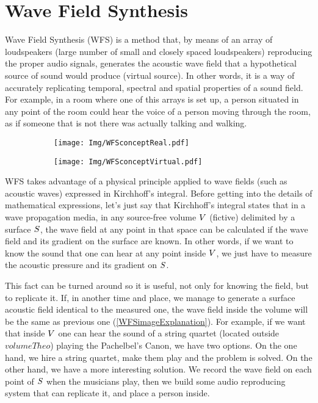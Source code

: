 \section{Wave Field Synthesis}
Wave Field Synthesis (WFS) is a method that, by means of an array of loudspeakers (large number of small and closely spaced loudspeakers) reproducing the proper audio signals, generates the acoustic wave field that a hypothetical source of sound would produce (virtual source). In other words, it is a way of accurately replicating temporal, spectral and spatial properties of a sound field. For example, in a room where one of this arrays is set up, a person situated in any point of the room could hear the voice of a person moving through the room, as if someone that is not there was actually talking and walking.

\begin{figure}[h]
	\centering
	\begin{subfigure}[c]{0.45\textwidth}
		\centering
		\texttt{[image: Img/WFSconceptReal.pdf]}
	\end{subfigure}
	\begin{subfigure}[c]{0.45\textwidth}
		\centering
		\texttt{[image: Img/WFSconceptVirtual.pdf]}
	\end{subfigure}
\end{figure}

WFS takes advantage of a physical principle applied to wave fields (such as acoustic waves) expressed in Kirchhoff's integral. Before getting into the details of mathematical expressions, let's just say that Kirchhoff's integral states that in a wave propagation media, in any source-free volume $V$ (fictive) delimited by a surface $S$, the wave field at any point in that space can be calculated if the wave field and its gradient on the surface are known. In other words, if we want to know the sound that one can hear at any point inside $V$, we just have to measure the acoustic pressure and its gradient on $S$.

This fact can be turned around so it is useful, not only for knowing the field, but to replicate it.
If, in another time and place, we manage to generate a surface acoustic field identical to the measured one, the wave field inside the volume will be the same as previous one (\autoref{WFSimageExplanation}).
For example, if we want that inside $V$ one can hear the sound of a string quartet (located outside $volumeTheo$) playing the Pachelbel's Canon, we have two options. On the one hand, we hire a string quartet, make them play and the problem is solved. On the other hand, we have a more interesting solution. We record the wave field on each point of $S$ when the musicians play, then we build some audio reproducing system that can replicate it, and place a person inside.

